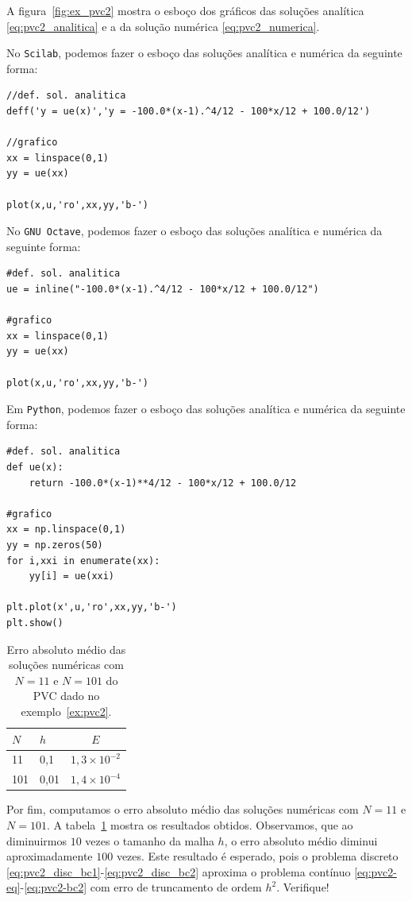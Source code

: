 \begin{sol}
A figura~\ref{fig:ex_pvc2} mostra o esboço dos gráficos das soluções analítica \eqref{eq:pvc2_analitica} e a da solução numérica \eqref{eq:pvc2_numerica}.

\ifisscilab
No \verb+Scilab+, podemos fazer o esboço das soluções analítica e numérica da seguinte forma:
\begin{verbatim}
//def. sol. analitica
deff('y = ue(x)','y = -100.0*(x-1).^4/12 - 100*x/12 + 100.0/12')

//grafico
xx = linspace(0,1)
yy = ue(xx)

plot(x,u,'ro',xx,yy,'b-')
\end{verbatim}
\fi
\ifisoctave
No \verb+GNU Octave+, podemos fazer o esboço das soluções analítica e numérica da seguinte forma:
\begin{verbatim}
#def. sol. analitica
ue = inline("-100.0*(x-1).^4/12 - 100*x/12 + 100.0/12")

#grafico
xx = linspace(0,1)
yy = ue(xx)

plot(x,u,'ro',xx,yy,'b-')
\end{verbatim}
\fi
\ifispython
Em \verb+Python+, podemos fazer o esboço das soluções analítica e numérica da seguinte forma:
\begin{verbatim}
#def. sol. analitica
def ue(x):
    return -100.0*(x-1)**4/12 - 100*x/12 + 100.0/12

#grafico
xx = np.linspace(0,1)
yy = np.zeros(50)
for i,xxi in enumerate(xx):
    yy[i] = ue(xxi)

plt.plot(x',u,'ro',xx,yy,'b-')
plt.show()
\end{verbatim}
\fi

\begin{table}
  \centering
  \caption{Erro absoluto médio das soluções numéricas com $N=11$ e $N=101$ do PVC dado no exemplo~\ref{ex:pvc2}.}
  \begin{tabular}{ll|c}
    $N$ & $h$ & $E$\\\hline
    11 & 0,1 & $1,3\times 10^{-2}$\\
    101 & 0,01 & $1,4\times 10^{-4}$
  \end{tabular}
  \label{tab:pvc2_erro}
\end{table}

Por fim, computamos o erro absoluto médio das soluções numéricas com $N=11$ e $N=101$. A tabela~\ref{tab:pvc2_erro} mostra os resultados obtidos. Observamos, que ao diminuirmos $10$ vezes o tamanho da malha $h$, o erro absoluto médio diminui aproximadamente $100$ vezes. Este resultado é esperado, pois o problema discreto \eqref{eq:pvc2_disc_bc1}-\eqref{eq:pvc2_disc_bc2} aproxima o problema contínuo \eqref{eq:pvc2-eq}-\eqref{eq:pvc2-bc2} com erro de truncamento de ordem $h^2$. Verifique!


\end{sol}
